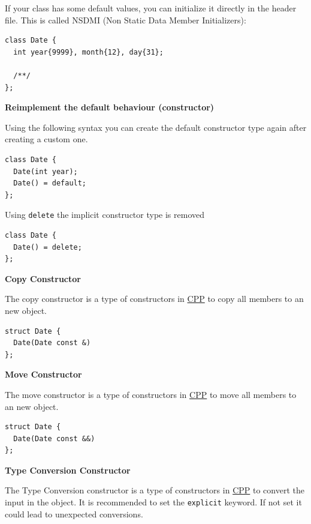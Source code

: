 \documentclass[11pt,twoside,landscape]{article}
\begin{document}
\begin{multicols}{3}
If your class has some default values, you can initialize it directly in the header file.
This is called NSDMI (Non Static Data Member Initializers):
\lstset{language=c++,label= ,caption= ,captionpos=b,numbers=none}
\begin{lstlisting}
class Date {
  int year{9999}, month{12}, day{31};

  /**/
};
\end{lstlisting}

\textbf{Reimplement the default behaviour (constructor)}

Using the following syntax you can create the default constructor type again after creating a custom one.

\lstset{language=c++,label= ,caption= ,captionpos=b,numbers=none}
\begin{lstlisting}
class Date {
  Date(int year);
  Date() = default;
};
\end{lstlisting}

Using \texttt{delete} the implicit constructor type is removed

\lstset{language=c++,label= ,caption= ,captionpos=b,numbers=none}
\begin{lstlisting}
class Date {
  Date() = delete;
};
\end{lstlisting}

\textbf{Copy Constructor}

The copy constructor is a type of constructors in \href{../../../roam/20210920103243-c.org}{CPP} to copy all members to an new object.

\lstset{language=c++,label= ,caption= ,captionpos=b,numbers=none}
\begin{lstlisting}
struct Date {
  Date(Date const &)
};
\end{lstlisting}

\textbf{Move Constructor}

The move constructor is a type of constructors in \href{../../../roam/20210920103243-c.org}{CPP} to move all members to an new object.
\lstset{language=c++,label= ,caption= ,captionpos=b,numbers=none}
\begin{lstlisting}
struct Date {
  Date(Date const &&)
};
\end{lstlisting}

\textbf{Type Conversion Constructor}

The Type Conversion constructor is a type of constructors in \href{../../../roam/20210920103243-c.org}{CPP} to convert the input in the object.
It is recommended to set the \texttt{explicit} keyword.
If not set it could lead to unexpected conversions.


\end{multicols}
\end{document}
